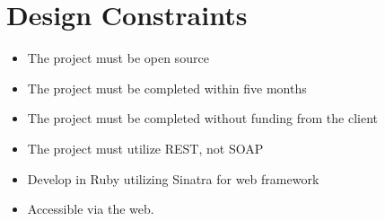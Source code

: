 \documentclass{article}
\begin{document}
\section{Design Constraints}
\begin{itemize}
\item The project must be open source
\item The project must be completed within five months
\item The project must be completed without funding from the client
\item The project must utilize REST, not SOAP\label{soap}
\item Develop in Ruby utilizing Sinatra for web framework
\item Accessible via the web.
\end{itemize} 
\end{document}

